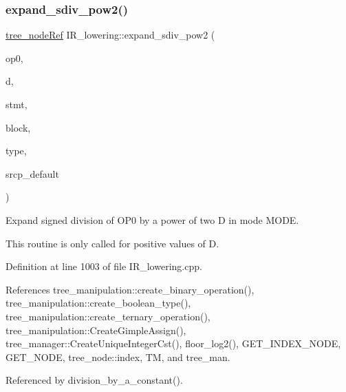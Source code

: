 \subsubsection{\texorpdfstring{expand\+\_\+sdiv\+\_\+pow2()}{expand\_sdiv\_pow2()}}
{\footnotesize\ttfamily \hyperlink{tree__node_8hpp_a6ee377554d1c4871ad66a337eaa67fd5}{tree\+\_\+node\+Ref} I\+R\+\_\+lowering\+::expand\+\_\+sdiv\+\_\+pow2 (\begin{DoxyParamCaption}\item[{\hyperlink{tree__node_8hpp_a6ee377554d1c4871ad66a337eaa67fd5}{tree\+\_\+node\+Ref}}]{op0,  }\item[{unsigned long long int}]{d,  }\item[{const \hyperlink{tree__node_8hpp_a6ee377554d1c4871ad66a337eaa67fd5}{tree\+\_\+node\+Ref}}]{stmt,  }\item[{const bloc\+Ref}]{block,  }\item[{\hyperlink{tree__node_8hpp_a6ee377554d1c4871ad66a337eaa67fd5}{tree\+\_\+node\+Ref} \&}]{type,  }\item[{const std\+::string \&}]{srcp\+\_\+default }\end{DoxyParamCaption})\hspace{0.3cm}{\ttfamily [private]}}



Expand signed division of O\+P0 by a power of two D in mode M\+O\+DE. 

This routine is only called for positive values of D. 

Definition at line 1003 of file I\+R\+\_\+lowering.\+cpp.



References tree\+\_\+manipulation\+::create\+\_\+binary\+\_\+operation(), tree\+\_\+manipulation\+::create\+\_\+boolean\+\_\+type(), tree\+\_\+manipulation\+::create\+\_\+ternary\+\_\+operation(), tree\+\_\+manipulation\+::\+Create\+Gimple\+Assign(), tree\+\_\+manager\+::\+Create\+Unique\+Integer\+Cst(), floor\+\_\+log2(), G\+E\+T\+\_\+\+I\+N\+D\+E\+X\+\_\+\+N\+O\+DE, G\+E\+T\+\_\+\+N\+O\+DE, tree\+\_\+node\+::index, TM, and tree\+\_\+man.



Referenced by division\+\_\+by\+\_\+a\+\_\+constant().

